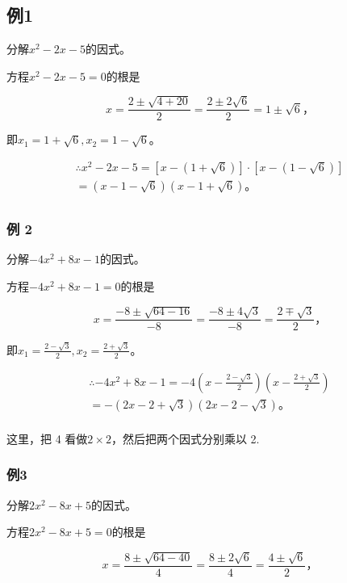 \subsection{例1}

分解\(x^{2} - 2x - 5\)的因式。

 方程\(x^{2} - 2x - 5 = 0\)的根是

\[
x = \frac{2 \pm \sqrt {4 + 20}}{2} = \frac{2 \pm 2 \sqrt {6}}{2} = 1 \pm \sqrt {6}\text{，}
\]

即\(x_{1} = 1 + \sqrt{6}, x_{2} = 1 - \sqrt{6}\)。

\[
\begin{array}{l} \therefore x ^ {2} - 2 x - 5 = [ x - (1 + \sqrt {6}) ] \cdot [ x - (1 - \sqrt {6}) ] \\ = (x - 1 - \sqrt {6}) (x - 1 + \sqrt {6})\text{。} \\ \end{array}
\]

\subsubsection{例 2}

分解\(-4x^{2}+8x-1\)的因式。

 方程\(-4x^{2}+8x-1=0\)的根是

\[
x = \frac{- 8 \pm \sqrt {64 - 16}}{- 8} = \frac{- 8 \pm 4 \sqrt {3}}{- 8} = \frac{2 \mp \sqrt {3}}{2}\text{，}
\]

即\(x_{1} = \frac{2 - \sqrt{3}}{2}, x_{2} = \frac{2 + \sqrt{3}}{2}\)。

\[
\begin{array}{l} \therefore - 4 x ^ {2} + 8 x - 1 = - 4 \left(x - \frac{2 - \sqrt {3}}{2}\right) \left(x - \frac{2 + \sqrt {3}}{2}\right) \\ = - (2 x - 2 + \sqrt {3}) (2 x - 2 - \sqrt {3})\text{。} \\ \end{array}
\]

 这里，把 4 看做\(2 \times 2\)，然后把两个因式分别乘以
2.

\subsubsection{例3}

分解\(2x^{2} - 8x + 5\)的因式。

 方程\(2x^{2} - 8x + 5 = 0\)的根是

\[
x = \frac{8 \pm \sqrt {64 - 40}}{4} = \frac{8 \pm 2 \sqrt {6}}{4} = \frac{4 \pm \sqrt {6}}{2}\text{，}
\]

